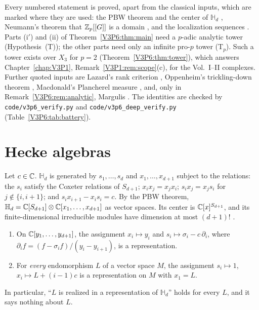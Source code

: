 Every numbered statement is proved, apart from the classical inputs, which are marked where
they are used: the PBW theorem and the center of $\mathbb H_d$ \cite{Lus89}, Neumann's theorem
that $\mathbb{Z}_p[[G]]$ is a domain \cite{Neu88}, and the localization sequences \cite{NR04}.
Parts (i$'$) and (ii) of Theorem~\ref{V3P6:thm:main} need a $p$-adic analytic tower
(Hypothesis~(T)); the other parts need only an infinite pro-$p$ tower (T$_p$). Such a tower exists
over $X_3$ for $p=2$ (Theorem~\ref{V3P6:thm:tower}), which answers Chapter~\ref{chap:V3P1},
Remark~\ref{V3P1:rem:scope}(c), for the Vol.~I--II complexes. Further quoted inputs are
Lazard's rank criterion \cite{DDMS}, Oppenheim's trickling-down theorem \cite{Opp18}, Macdonald's
Plancherel measure \cite{Mac71}, and, only in Remark~\ref{V3P6:rem:analytic}, Margulis
\cite{Mar91}. The identities are checked by \texttt{code/v3p6\_verify.py} and
\texttt{code/v3p6\_deep\_verify.py} (Table~\ref{V3P6:tab:battery}).

\section{Hecke algebras}\label{V3P6:sec:hecke}

\begin{definition}\label{V3P6:def:dah}
Let $c\in\mathbb{C}$. $\mathbb H_d$ is generated by $s_1,\dots,s_d$ and $x_1,\dots,x_{d+1}$ subject to
the relations: the $s_i$ satisfy the Coxeter relations of $S_{d+1}$; $x_ix_j=x_jx_i$;
$s_ix_j=x_js_i$ for $j\notin\{i,i+1\}$; and $s_ix_{i+1}-x_is_i=c$. By the PBW theorem,
$\mathbb H_d=\mathbb{C}[S_{d+1}]\otimes\mathbb{C}[x_1,\dots,x_{d+1}]$ as vector spaces. Its center is
$\mathbb{C}[x]^{S_{d+1}}$, and its finite-dimensional irreducible modules have dimension at most
$(d+1)!$ \cite{Lus89}.
\end{definition}

\begin{proposition}\label{V3P6:prop:reps}
\begin{enumerate}
\item[(i)] On $\mathbb{C}[y_1,\dots,y_{d+1}]$, the assignment $x_i\mapsto y_i$ and $s_i\mapsto\sigma_i-c\,\partial_i$,
where $\partial_if=(f-\sigma_if)/(y_i-y_{i+1})$, is a representation.
\item[(ii)] For \emph{every} endomorphism $L$ of a vector space $M$, the assignment
$s_i\mapsto1$, $x_i\mapsto L+(i-1)c$ is a representation on $M$ with $x_1=L$.
\end{enumerate}
In particular, ``$L$ is realized in a representation of $\mathbb H_d$'' holds for every $L$,
and it says nothing about $L$.
\end{proposition}

